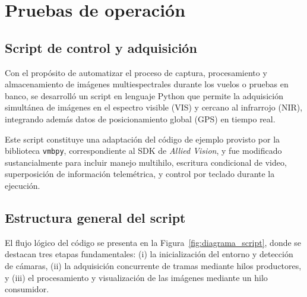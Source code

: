     
    



\section{Pruebas de operación}
  \subsection{Script de control y adquisición}
    \label{sec:script_control_adquisicion}
    
    Con el propósito de automatizar el proceso de captura, procesamiento y almacenamiento de imágenes multiespectrales durante los vuelos o pruebas en banco, se desarrolló un script en lenguaje Python que permite la adquisición simultánea de imágenes en el espectro visible (VIS) y cercano al infrarrojo (NIR), integrando además datos de posicionamiento global (GPS) en tiempo real.
    
    \noindent Este script constituye una adaptación del código de ejemplo provisto por la biblioteca \texttt{vmbpy}, correspondiente al SDK de \textit{Allied Vision}, y fue modificado sustancialmente para incluir manejo multihilo, escritura condicional de video, superposición de información telemétrica, y control por teclado durante la ejecución.
    
    \subsection{Estructura general del script}
    
    El flujo lógico del código se presenta en la Figura~\ref{fig:diagrama_script}, donde se destacan tres etapas fundamentales: (i) la inicialización del entorno y detección de cámaras, (ii) la adquisición concurrente de tramas mediante hilos productores, y (iii) el procesamiento y visualización de las imágenes mediante un hilo consumidor.
    
